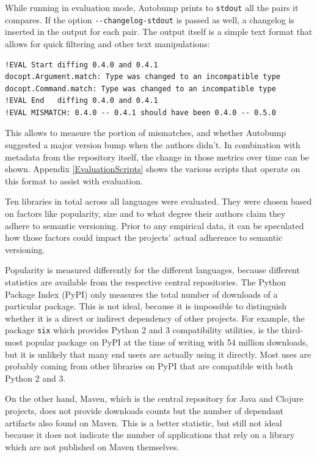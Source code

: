 \documentclass{l4proj}
\newcommand\genericstyle{\lstset{basicstyle=\ttm}}
\newcommand\codeinline[1]{{\genericstyle\lstinline!#1!}}
\begin{document}
While running in evaluation mode, Autobump prints to
\codeinline{stdout} all the pairs it compares. If the option
\codeinline{--changelog-stdout} is passed as well, a changelog is
inserted in the output for each pair. The output itself is a simple
text format that allows for quick filtering and other text
manipulations:

\begin{center}
\begin{BVerbatim}
!EVAL Start diffing 0.4.0 and 0.4.1
docopt.Argument.match: Type was changed to an incompatible type
docopt.Command.match: Type was changed to an incompatible type
!EVAL End   diffing 0.4.0 and 0.4.1
!EVAL MISMATCH: 0.4.0 -- 0.4.1 should have been 0.4.0 -- 0.5.0
\end{BVerbatim}
\end{center}

This allows to measure the portion of mismatches, and whether Autobump
suggested a major version bump when the authors didn't. In combination
with metadata from the repository itself, the change in those metrics
over time can be shown. Appendix \ref{EvaluationScripts} shows the
various scripts that operate on this format to assist with evaluation.

Ten libraries in total across all languages were evaluated. They were
chosen based on factors like popularity, size and to what degree their
authors claim they adhere to semantic versioning. Prior to any
empirical data, it can be speculated how those factors could impact
the projects' actual adherence to semantic versioning.

Popularity is measured differently for the different languages, because
different statistics are available from the respective central
repositories. The Python Package Index (PyPI) \cite{PyPI} only measures
the total number of downloads of a particular package. This is not
ideal, because it is impossible to distinguish whether it is a direct
or indirect dependency of other projects. For example, the package
\codeinline{six} which provides Python 2 and 3 compatibility
utilities, is the third-most popular package on PyPI at the time of
writing with 54 million downloads, but it is unlikely that many end
users are actually using it directly. Most uses are probably coming
from other libraries on PyPI that are compatible with both Python 2
and 3.

On the other hand, Maven, which is the central repository for Java and
Clojure projects, does not provide downloads counts but the number of
dependant artifacts also found on Maven. This is a better statistic,
but still not ideal because it does not indicate the number of
applications that rely on a library which are not published on Maven
themselves.
\end{document}
